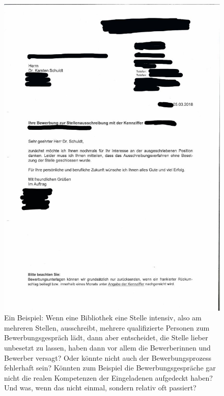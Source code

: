\documentclass[a4paper,
fontsize=11pt,
oneside,
numbers=noperiodatend,
parskip=half-,
bibliography=totoc,
final
]{scrartcl}
\begin{document}
\begin{figure}
\centering
\includegraphics{img/image_1.jpg}
\caption{Ein Beispiel: Wenn eine Bibliothek eine Stelle intensiv, also
am mehreren Stellen, ausschreibt, mehrere qualifizierte Personen zum
Bewerbungsgespräch lädt, dann aber entscheidet, die Stelle lieber
unbesetzt zu lassen, haben dann vor allem die Bewerberinnen und Bewerber
versagt? Oder könnte nicht auch der Bewerbungsprozess fehlerhaft sein?
Könnten zum Beispiel die Bewerbungsgespräche gar nicht die realen
Kompetenzen der Eingeladenen aufgedeckt haben? Und was, wenn das nicht
einmal, sondern relativ oft passiert?}
\end{figure}
\end{document}
